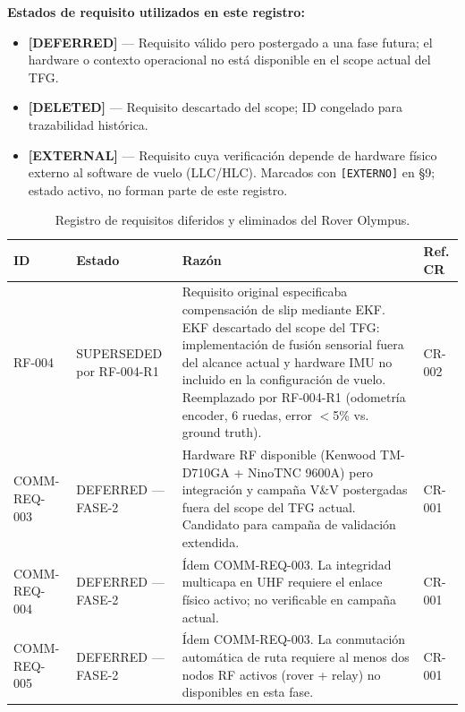 \textbf{Estados de requisito utilizados en este registro:}
\begin{itemize}
    \item \textbf{[DEFERRED]} — Requisito válido pero postergado a una fase futura; el hardware o contexto operacional no está disponible en el scope actual del TFG.
    \item \textbf{[DELETED]} — Requisito descartado del scope; ID congelado para trazabilidad histórica.
    \item \textbf{[EXTERNAL]} — Requisito cuya verificación depende de hardware físico externo al software de vuelo (LLC/HLC). Marcados con \texttt{[EXTERNO]} en §9; estado activo, no forman parte de este registro.
\end{itemize}

\begin{table}[H]
\centering
\scriptsize
\begin{tabularx}{\textwidth}{| l | l | X | l |}
\hline
\textbf{ID} & \textbf{Estado} & \textbf{Razón} & \textbf{Ref. CR} \\ \hline

RF-004 & SUPERSEDED por RF-004-R1 &
Requisito original especificaba compensación de slip mediante EKF. EKF descartado del scope del TFG: implementación de fusión sensorial fuera del alcance actual y hardware IMU no incluido en la configuración de vuelo. Reemplazado por RF-004-R1 (odometría encoder, 6 ruedas, error $<$5\% vs. ground truth). &
CR-002 \\ \hline

COMM-REQ-003 & DEFERRED — FASE-2 &
Hardware RF disponible (Kenwood TM-D710GA + NinoTNC 9600A) pero integración y campaña V\&V postergadas fuera del scope del TFG actual. Candidato para campaña de validación extendida. &
CR-001 \\ \hline

COMM-REQ-004 & DEFERRED — FASE-2 &
Ídem COMM-REQ-003. La integridad multicapa en UHF requiere el enlace físico activo; no verificable en campaña actual. &
CR-001 \\ \hline

COMM-REQ-005 & DEFERRED — FASE-2 &
Ídem COMM-REQ-003. La conmutación automática de ruta requiere al menos dos nodos RF activos (rover + relay) no disponibles en esta fase. &
CR-001 \\ \hline

\end{tabularx}
\caption{Registro de requisitos diferidos y eliminados del Rover Olympus.}
\label{tab:deferred}
\end{table}

